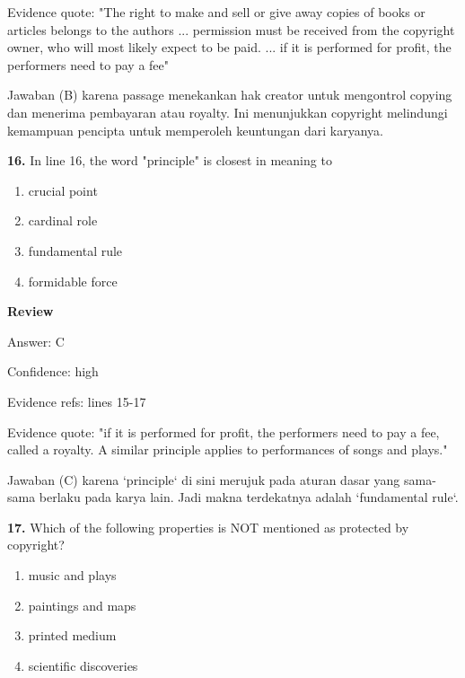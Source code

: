 \documentclass[12pt]{article}
\begin{document}
Evidence quote: "The right to make and sell or give away copies of books or articles belongs to the authors ... permission must be received from the copyright owner, who will most likely expect to be paid. ... if it is performed for profit, the performers need to pay a fee"\par
Jawaban (B) karena passage menekankan hak creator untuk mengontrol copying dan menerima pembayaran atau royalty. Ini menunjukkan copyright melindungi kemampuan pencipta untuk memperoleh keuntungan dari karyanya.\par
\endgroup
\par
\vspace{0.25\baselineskip}
\noindent\textbf{16.} In line 16, the word "principle" is closest in meaning to
\begin{enumerate}[label=(\Alph*),leftmargin=*,itemsep=0.2em]
\item crucial point
\item cardinal role
\item fundamental rule
\item formidable force
\end{enumerate}
\par
\begingroup
\setlength{\parskip}{0pt}
\setlength{\parindent}{0pt}
\textbf{Review}\par
Answer: C\par
Confidence: high\par
Evidence refs: lines 15-17\par
Evidence quote: "if it is performed for profit, the performers need to pay a fee, called a royalty. A similar principle applies to performances of songs and plays."\par
Jawaban (C) karena `principle` di sini merujuk pada aturan dasar yang sama-sama berlaku pada karya lain. Jadi makna terdekatnya adalah `fundamental rule`.\par
\endgroup
\par
\vspace{0.25\baselineskip}
\noindent\textbf{17.} Which of the following properties is NOT mentioned as protected by copyright?
\begin{enumerate}[label=(\Alph*),leftmargin=*,itemsep=0.2em]
\item music and plays
\item paintings and maps
\item printed medium
\item scientific discoveries
\end{enumerate}
\par
\end{document}

